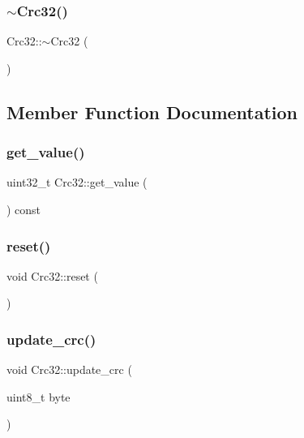\subsubsection{\texorpdfstring{$\sim$\+Crc32()}{~Crc32()}}
{\footnotesize\ttfamily Crc32\+::$\sim$\+Crc32 (\begin{DoxyParamCaption}{ }\end{DoxyParamCaption})\hspace{0.3cm}{\ttfamily [inline]}}



\subsection{Member Function Documentation}
\hypertarget{class_crc32_a9348375ed3372b4287ed821018de5c9d}{}\label{class_crc32_a9348375ed3372b4287ed821018de5c9d} 
\subsubsection{\texorpdfstring{get\+\_\+value()}{get\_value()}}
{\footnotesize\ttfamily uint32\+\_\+t Crc32\+::get\+\_\+value (\begin{DoxyParamCaption}{ }\end{DoxyParamCaption}) const\hspace{0.3cm}{\ttfamily [inline]}}

\hypertarget{class_crc32_a3a7ab26889bce23552efd6f519b27002}{}\label{class_crc32_a3a7ab26889bce23552efd6f519b27002} 
\subsubsection{\texorpdfstring{reset()}{reset()}}
{\footnotesize\ttfamily void Crc32\+::reset (\begin{DoxyParamCaption}{ }\end{DoxyParamCaption})\hspace{0.3cm}{\ttfamily [inline]}}

\hypertarget{class_crc32_a22582588a048f4fadd2893a32e283b1b}{}\label{class_crc32_a22582588a048f4fadd2893a32e283b1b} 
\subsubsection{\texorpdfstring{update\+\_\+crc()}{update\_crc()}\hspace{0.1cm}{\footnotesize\ttfamily [1/2]}}
{\footnotesize\ttfamily void Crc32\+::update\+\_\+crc (\begin{DoxyParamCaption}\item[{uint8\+\_\+t}]{byte }\end{DoxyParamCaption})\hspace{0.3cm}{\ttfamily [inline]}}

